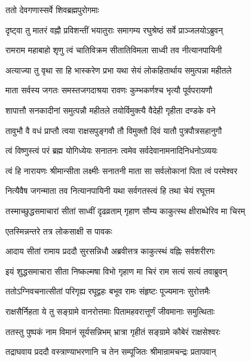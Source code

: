 ततो देवगणास्सर्वे शिवब्रह्मपुरोगमाः

\twolineshloka
{दृष्ट्वा तु मातरं वह्नौ प्रविशन्तीं भयातुराः}
{समागम्य रघुश्रेष्ठं सर्वे प्राञ्जलयोऽब्रुवन्}%


\twolineshloka
{रामराम महाबाहो शृणु त्वं चातिविक्रम}
{सीतातिविमला साध्वी तव नीत्यानपायिनी}%

\twolineshloka
{अत्याज्या तु वृथा सा हि भास्करेण प्रभा यथा}
{सेयं लोकहितार्थाय समुत्पन्ना महीतले}%

\twolineshloka
{माता सर्वस्य जगतः समस्तजगदाश्रया}
{रावणः कुम्भकर्णश्च भृत्यौ पूर्वपरायणौ}%

\twolineshloka
{शापात्तौ सनकादीनां समुत्पन्नौ महीतले}
{तयोर्विमुक्त्यै वैदेही गृहीता दण्डके वने}%

\twolineshloka
{तावुभौ वै वधं प्राप्तौ त्वया राक्षसपुङ्गवौ}
{तौ विमुक्तौ दिवं यातौ पुत्रपौत्रसहानुगौ}%

\twolineshloka
{त्वं विष्णुस्त्वं परं ब्रह्म योगिध्येयः सनातनः}
{त्वमेव सर्वदेवानामनादिनिधनोऽव्ययः}%

\twolineshloka
{त्वं हि नारायणः श्रीमान्सीता लक्ष्मीः सनातनी}
{माता सा सर्वलोकानां पिता त्वं परमेश्वर}%

\twolineshloka
{नित्यैवैष जगन्माता तव नित्यानपायिनी}
{यथा सर्वगतस्त्वं हि तथा चेयं रघूत्तम}%

\twolineshloka
{तस्माच्छुद्धसमाचारां सीतां साध्वीं दृढव्रताम्}
{गृहाण सौम्य काकुत्स्थ क्षीराब्धेरिव मा चिरम्}%


एतस्मिन्नन्तरे तत्र लोकसाक्षी स पावकः

\twolineshloka
{आदाय सीतां रामाय प्रददौ सुरसन्निधौ}
{अब्रवीत्तत्र काकुत्स्थं वह्निः सर्वशरीरगः}%


\twolineshloka
{इयं शुद्धसमाचारा सीता निष्कल्मषा विभो}
{गृहाण मा चिरं राम सत्यं सत्यं तवाब्रुवन्}%


\twolineshloka
{ततोऽग्निवचनात्सीतां परिगृह्य रघूद्वहः}
{बभूव रामः संहृष्टः पूज्यमानः सुरोत्तमैः}%

\twolineshloka
{राक्षसैर्निहता ये तु सङ्ग्रामे वानरोत्तमाः}
{पितामहवरात्तूर्णं जीवमानाः समुत्थिताः}%

\twolineshloka
{ततस्तु पुष्पकं नाम विमानं सूर्यसन्निभम्}
{भ्रात्रा गृहीतं सङ्ग्रामे कौबेरं राक्षसेश्वरः}%

\twolineshloka
{तद्राघवाय प्रददौ वस्त्राण्याभरणानि च}
{तेन सम्पूजितः श्रीमान्रामचन्द्रः प्रतापवान्}%

